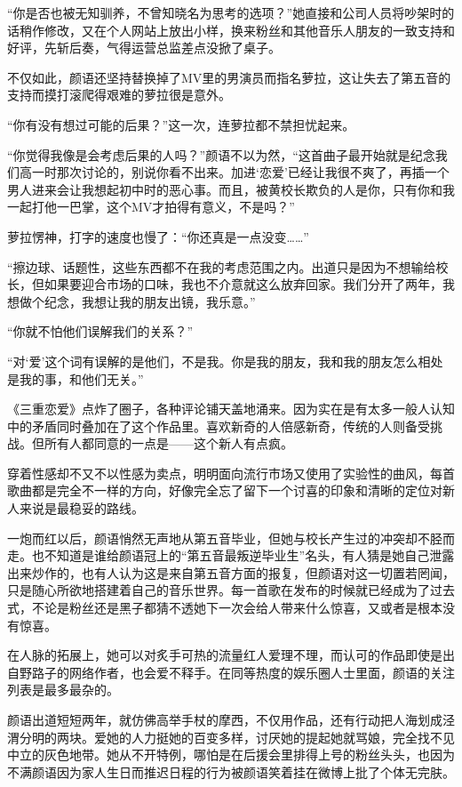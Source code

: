 \documentclass[UTF8, scheme = chinese, openany]{ctexbook}
\begin{document}
“你是否也被无知驯养，不曾知晓名为思考的选项？”她直接和公司人员将吵架时的话稍作修改，又在个人网站上放出小样，换来粉丝和其他音乐人朋友的一致支持和好评，先斩后奏，气得运营总监差点没掀了桌子。

不仅如此，颜语还坚持替换掉了MV里的男演员而指名萝拉，这让失去了第五音的支持而摸打滚爬得艰难的萝拉很是意外。

“你有没有想过可能的后果？”这一次，连萝拉都不禁担忧起来。

“你觉得我像是会考虑后果的人吗？”颜语不以为然，“这首曲子最开始就是纪念我们高一时那次讨论的，别说你看不出来。加进‘恋爱’已经让我很不爽了，再插一个男人进来会让我想起初中时的恶心事。而且，被黄校长欺负的人是你，只有你和我一起打他一巴掌，这个MV才拍得有意义，不是吗？”

萝拉愣神，打字的速度也慢了：“你还真是一点没变……”

“擦边球、话题性，这些东西都不在我的考虑范围之内。出道只是因为不想输给校长，但如果要迎合市场的口味，我也不介意就这么放弃回家。我们分开了两年，我想做个纪念，我想让我的朋友出镜，我乐意。”

“你就不怕他们误解我们的关系？”

“对‘爱’这个词有误解的是他们，不是我。你是我的朋友，我和我的朋友怎么相处是我的事，和他们无关。”

\vspace{1.5em}

《三重恋爱》点炸了圈子，各种评论铺天盖地涌来。因为实在是有太多一般人认知中的矛盾同时叠加在了这个作品里。喜欢新奇的人倍感新奇，传统的人则备受挑战。但所有人都同意的一点是——这个新人有点疯。

穿着性感却不又不以性感为卖点，明明面向流行市场又使用了实验性的曲风，每首歌曲都是完全不一样的方向，好像完全忘了留下一个讨喜的印象和清晰的定位对新人来说是最稳妥的路线。

一炮而红以后，颜语悄然无声地从第五音毕业，但她与校长产生过的冲突却不胫而走。也不知道是谁给颜语冠上的“第五音最叛逆毕业生”名头，有人猜是她自己泄露出来炒作的，也有人认为这是来自第五音方面的报复，但颜语对这一切置若罔闻，只是随心所欲地搭建着自己的音乐世界。每一首歌在发布的时候就已经成为了过去式，不论是粉丝还是黑子都猜不透她下一次会给人带来什么惊喜，又或者是根本没有惊喜。

在人脉的拓展上，她可以对炙手可热的流量红人爱理不理，而认可的作品即使是出自野路子的网络作者，也会爱不释手。在同等热度的娱乐圈人士里面，颜语的关注列表是最多最杂的。

颜语出道短短两年，就仿佛高举手杖的摩西，不仅用作品，还有行动把人海划成泾渭分明的两块。爱她的人力挺她的百变多样，讨厌她的提起她就骂娘，完全找不见中立的灰色地带。她从不开特例，哪怕是在后援会里排得上号的粉丝头头，也因为不满颜语因为家人生日而推迟日程的行为被颜语笑着挂在微博上批了个体无完肤。
\end{document}
